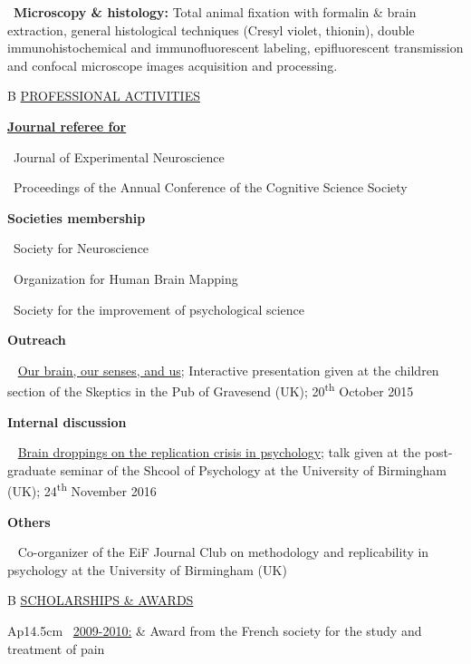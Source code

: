 \documentclass[a4paper,12pt,oneside]{letter}
\begin{document}
{\textbullet~\textbf{Microscopy \& histology:} Total animal fixation with formalin \& brain extraction, general histological techniques (Cresyl violet, thionin), double immunohistochemical and immunofluorescent labeling, epifluorescent transmission and confocal microscope images acquisition and processing.


\medskip 

\begin{tabular}{B}
 \underline{PROFESSIONAL ACTIVITIES}
\end{tabular}


\href{http://publons.com/author/1205193/remi-gau#profile}{\textbf{Journal referee for} }

\textbullet~Journal of Experimental Neuroscience

\textbullet~Proceedings of the Annual Conference of the Cognitive Science Society


\textbf{Societies membership}

\textbullet~Society for Neuroscience

\textbullet~Organization for Human Brain Mapping

\textbullet~Society for the improvement of psychological science


\textbf{Outreach}

\textbullet~ \href{https://dx.doi.org/10.6084/m9.figshare.4535423.v1}{Our brain, our senses, and us}; Interactive presentation given at the children section of the Skeptics in the Pub of Gravesend (UK); 20\textsuperscript{th} October 2015


\textbf{Internal discussion}

\textbullet~ \href{https://dx.doi.org/10.6084/m9.figshare.4257992.v1}{Brain droppings on the replication crisis in psychology}; talk given at the post-graduate seminar of the Shcool of Psychology at the University of Birmingham (UK); 24\textsuperscript{th} November 2016


\textbf{Others}

\textbullet~ Co-organizer of the EiF Journal Club on methodology and replicability in psychology at the University of Birmingham (UK)



\medskip 

\begin{tabular}{B}
 \underline{SCHOLARSHIPS \& AWARDS}
\end{tabular}

\begin{tabular}{Ap{14.5cm}}
\textbullet~\underline{2009-2010:} & Award from the French society for the study and treatment of pain\\
     

\end{tabular}}
\end{document}
